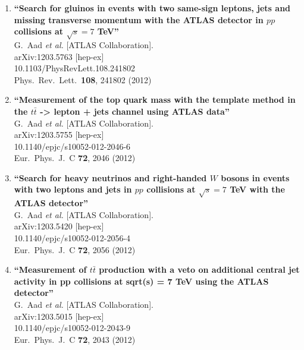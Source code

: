 \documentclass{article}
\begin{document}
\begin{enumerate}
\item%
{\bf ``Search for gluinos in events with two same-sign leptons, jets and missing transverse momentum with the ATLAS detector in $pp$ collisions at $\sqrt{s}=7$ TeV''}
  \\{}G.~Aad {\it et al.}  [ATLAS Collaboration].
  \\{}arXiv:1203.5763 [hep-ex]
    \\{}10.1103/PhysRevLett.108.241802
\\{}Phys.\ Rev.\ Lett.\  {\bf 108}, 241802 (2012) %


\item%
{\bf ``Measurement of the top quark mass with the template method in the $t \bar{t}$ -> lepton + jets channel using ATLAS data''}
  \\{}G.~Aad {\it et al.}  [ATLAS Collaboration].
  \\{}arXiv:1203.5755 [hep-ex]
    \\{}10.1140/epjc/s10052-012-2046-6
\\{}Eur.\ Phys.\ J.\ C {\bf 72}, 2046 (2012) %


\item%
{\bf ``Search for heavy neutrinos and right-handed $W$ bosons in events with two leptons and jets in $pp$ collisions at $\sqrt{s}=7$ TeV with the ATLAS detector''}
  \\{}G.~Aad {\it et al.}  [ATLAS Collaboration].
  \\{}arXiv:1203.5420 [hep-ex]
    \\{}10.1140/epjc/s10052-012-2056-4
\\{}Eur.\ Phys.\ J.\ C {\bf 72}, 2056 (2012) %


\item%
{\bf ``Measurement of $t \bar{t}$ production with a veto on additional central jet activity in pp collisions at sqrt(s) = 7 TeV using the ATLAS detector''}
  \\{}G.~Aad {\it et al.}  [ATLAS Collaboration].
  \\{}arXiv:1203.5015 [hep-ex]
    \\{}10.1140/epjc/s10052-012-2043-9
\\{}Eur.\ Phys.\ J.\ C {\bf 72}, 2043 (2012) %



\end{enumerate}
\end{document}

